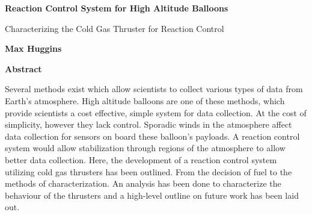 \thispagestyle{plain}
\begin{center}
    \large
    \textbf{Reaction Control System for High Altitude Balloons}
        
    \vspace{0.4cm}
    \normalsize
    Characterizing the Cold Gas Thruster for Reaction Control
        
    \vspace{0.4cm}
    \textbf{Max Huggins}
       
    \vspace{0.9cm}
    \textbf{Abstract}
\end{center}
Several methods exist which allow scientists to collect various types of data from Earth's atmosphere. High altitude balloons are one of these methods, which provide scientists a cost effective, simple system for data collection. At the cost of simplicity, however they lack control. Sporadic winds in the atmosphere affect data collection for sensors on board these balloon's payloads. A reaction control system would allow stabilization through regions of the atmosphere to allow better data collection. Here, the development of a reaction control system utilizing cold gas thrusters has been outlined. From the decision of fuel to the methods of characterization. An analysis has been done to characterize the behaviour of the thrusters and a high-level outline on future work has been laid out. 